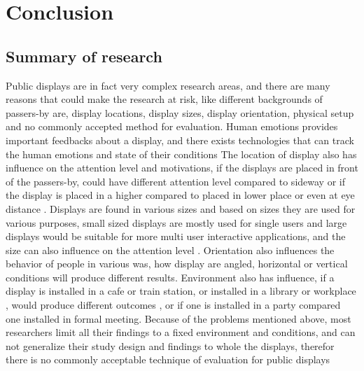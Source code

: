 \chapter{Conclusion} %

\label{Chapter10} %
\newpage



\section{Summary of research}
Public displays are in fact very complex research areas, and there are many reasons that could make the research at risk, like different backgrounds of passers-by are, display locations, display sizes, display orientation, physical setup and no commonly accepted method for evaluation. Human emotions provides important feedbacks about a display, and there exists technologies that can track the human emotions and state of their conditions\cite{TrackeMotion} The location of display also has influence on the attention level and motivations, if the displays are placed in front of the passers-by, could have different attention level compared to sideway or if the display is placed in a higher compared to placed in lower place or even at eye distance \cite{WhenPublicDisplays}. Displays are found in various sizes and based on sizes they are used for various purposes, small sized displays are mostly used for single users and large displays would be suitable for more multi user interactive applications, and the size can also influence on the attention level \cite{WhenPublicDisplays}. Orientation also influences the behavior of people in various was, how display are angled, horizontal or vertical conditions will produce different results\cite{DisplayAngleEffect}. Environment also has influence, if a display is installed in a cafe or train station\cite{multimediaworkplace}, or installed in a library or workplace \cite{multimediaworkplace}, would produce different outcomes \cite{semidisplay}, or if one is installed in a party compared one installed in formal meeting. Because of the problems mentioned above, most researchers limit all their findings to a fixed environment and conditions, and can not generalize their study design and findings to whole the displays, therefor there is no commonly acceptable technique of evaluation for public displays \cite{HowToEvaluate} 

